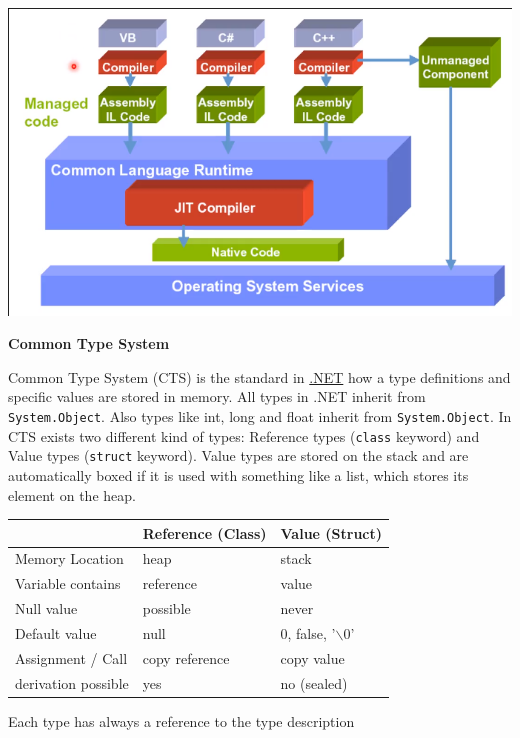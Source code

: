 \documentclass[11pt,twoside,landscape]{article}
\begin{document}
\begin{multicols}{3}
\begin{center}
\includegraphics[width=.9\linewidth]{img/clr_architektur.png}
\label{org97ec0a6}
\end{center}

\textbf{Common Type System}

Common Type System (CTS) is the standard in \href{../../../roam/20211003114703-net.org}{.NET} how a type definitions and specific values are stored in memory.
All types in .NET inherit from \texttt{System.Object}. Also types like int, long and float inherit from \texttt{System.Object}. In CTS exists two different kind of types: Reference types (\texttt{class} keyword) and Value types (\texttt{struct} keyword). Value types are stored on the stack and are automatically boxed if it is used with something like a list, which stores its  element on the heap. 

\begin{table}[htbp]
\label{tab:org2a2b91b}
\centering
\begin{tabular}{lll}
 & Reference (Class) & Value (Struct)\\
\hline
Memory Location & heap & stack\\
Variable contains & reference & value\\
Null value & possible & never\\
Default value & null & 0, false, '$\backslash$0'\\
Assignment / Call & copy reference & copy value\\
derivation possible & yes & no (sealed)\\
\end{tabular}
\end{table}

Each type has always a reference to the type description 


\end{multicols}
\end{document}
